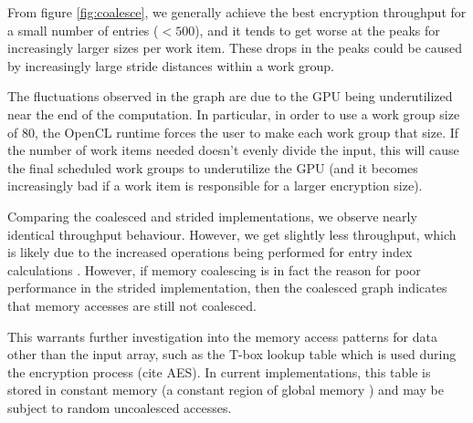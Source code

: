 \documentclass[conference,10pt]{IEEEtran}
\begin{document}
From figure \ref{fig:coalesce}, we generally achieve the best encryption throughput for a small 
number of entries ($< 500$), and it tends to get worse at the peaks for increasingly larger sizes 
per work item.  These drops in the peaks could be caused by increasingly large stride distances 
within a work group. 

The fluctuations observed in the graph are due to the GPU being underutilized near the end of the 
computation.  In particular, in order to use a work group size of 80, the OpenCL runtime forces the 
user to make each work group that size.  If the number of work items needed doesn't evenly divide 
the input, this will cause the final scheduled work groups to underutilize the GPU (and it becomes 
increasingly bad if a work item is responsible for a larger encryption size).

Comparing the coalesced and strided implementations, we observe nearly identical throughput 
behaviour.  However, we get slightly less throughput, which is likely due to the increased 
operations being performed for entry index calculations \cite{opencl_guide}.  However, if memory 
coalescing is in fact the reason for poor performance in the strided implementation, then the 
coalesced graph indicates that memory accesses are still not coalesced.  

This warrants further investigation into the memory access patterns for data other than the input 
array, such as the T-box lookup table which is used during the encryption process (cite AES).  In  
current implementations, this table is stored in constant memory (a constant region of global memory 
\cite{opencl_guide}) and may be subject to random uncoalesced accesses.



%
%
\end{document}
